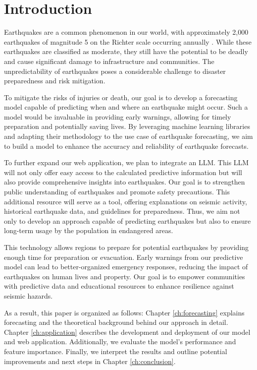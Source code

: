 
\chapter{Introduction}

Earthquakes are a common phenomenon in our world, with approximately 2,000 earthquakes
of magnitude 5 on the Richter scale occurring annually \parencite{welt_erdbeben}.
While these earthquakes are classified as moderate, they still have the potential
to be deadly and cause significant damage to infrastructure and communities. The
unpredictability of earthquakes poses a considerable challenge to disaster preparedness
and risk mitigation.

To mitigate the risks of injuries or death, our goal is to develop a forecasting model
capable of predicting when and where an earthquake might occur. Such a model would be
invaluable in providing early warnings, allowing for timely preparation and potentially
saving lives. By leveraging machine learning libraries and adapting their methodology
to the use case of earthquake forecasting, we aim to build a model to
enhance the accuracy and reliability of earthquake forecasts.

To further expand our web application, we plan to integrate an \ac{LLM}. This \ac{LLM}
will not only offer easy access to the calculated predictive information but will
also provide comprehensive insights into earthquakes. Our goal is to strengthen public
understanding of earthquakes and promote safety precautions. This additional resource
will serve as a tool, offering explanations on seismic activity, historical earthquake
data, and guidelines for preparedness. Thus, we aim not only to develop an approach
capable of predicting earthquakes but also to ensure long-term usage by the population
in endangered areas.

This technology allows regions to prepare for potential earthquakes by providing
enough time for preparation or evacuation. Early warnings from our predictive
model can lead to better-organized emergency responses, reducing the impact of
earthquakes on human lives and property. Our goal is to empower communities with
predictive data and educational resources to enhance resilience against seismic hazards.

As a result, this paper is organized as follows: Chapter \ref{ch:forecasting} explains
forecasting and the theoretical background behind our approach in detail. Chapter
\ref{ch:application} describes the development and deployment of our model and web
application. Additionally, we evaluate the model's performance and feature importance.
Finally, we interpret the results and outline potential improvements and next steps in
Chapter \ref{ch:conclusion}.